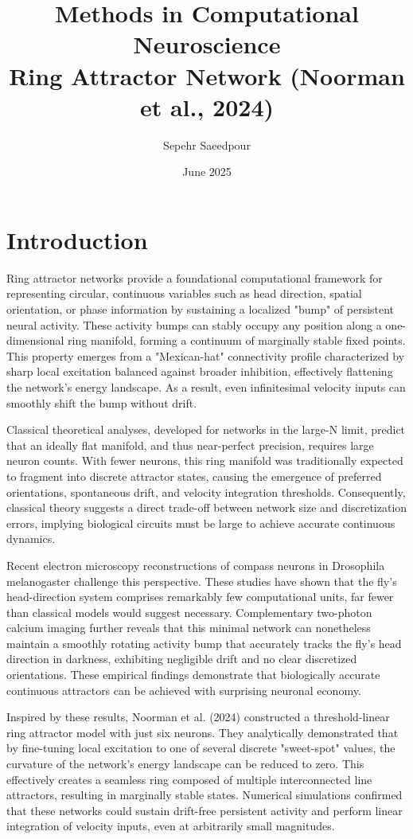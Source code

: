 \documentclass[11pt,a4paper]{article}
\title{Methods in Computational Neuroscience\\
Ring Attractor Network (Noorman et al., 2024)}
\author{Sepehr Saeedpour}
\date{June 2025}
\begin{document}
\maketitle

\section*{Introduction}
Ring attractor networks provide a foundational computational framework for representing circular, continuous variables such as head direction, spatial orientation, or phase information by sustaining a localized "bump" of persistent neural activity. These activity bumps can stably occupy any position along a one-dimensional ring manifold, forming a continuum of marginally stable fixed points. This property emerges from a "Mexican-hat" connectivity profile characterized by sharp local excitation balanced against broader inhibition, effectively flattening the network's energy landscape. As a result, even infinitesimal velocity inputs can smoothly shift the bump without drift.

Classical theoretical analyses, developed for networks in the large-N limit, predict that an ideally flat manifold, and thus near-perfect precision, requires large neuron counts. With fewer neurons, this ring manifold was traditionally expected to fragment into discrete attractor states, causing the emergence of preferred orientations, spontaneous drift, and velocity integration thresholds. Consequently, classical theory suggests a direct trade-off between network size and discretization errors, implying biological circuits must be large to achieve accurate continuous dynamics.

Recent electron microscopy reconstructions of compass neurons in Drosophila melanogaster challenge this perspective. These studies have shown that the fly's head-direction system comprises remarkably few computational units, far fewer than classical models would suggest necessary. Complementary two-photon calcium imaging further reveals that this minimal network can nonetheless maintain a smoothly rotating activity bump that accurately tracks the fly's head direction in darkness, exhibiting negligible drift and no clear discretized orientations. These empirical findings demonstrate that biologically accurate continuous attractors can be achieved with surprising neuronal economy.

Inspired by these results, Noorman et al. (2024) constructed a threshold-linear ring attractor model with just six neurons. They analytically demonstrated that by fine-tuning local excitation to one of several discrete "sweet-spot" values, the curvature of the network's energy landscape can be reduced to zero. This effectively creates a seamless ring composed of multiple interconnected line attractors, resulting in marginally stable states. Numerical simulations confirmed that these networks could sustain drift-free persistent activity and perform linear integration of velocity inputs, even at arbitrarily small magnitudes.
\end{document}
